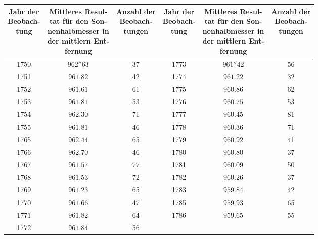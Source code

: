 \begin{center}\small
\setlength{\tabcolsep}{3pt}
\begin{tabular}{c|c|c||c|c|c}
\shortstack{Jahr der\\Beobach-\\tung}&\shortstack{Mittleres Resul-\\tat für den Son-\\nenhalbmesser in\\der mittlern Ent-\\fernung}&\shortstack{Anzahl der\\Beobach-\\tungen}&\shortstack{Jahr der\\Beobach-\\tung}&\shortstack{Mittleres Resul-\\tat für den Son-\\nenhalbmesser in\\der mittlern Ent-\\fernung}&\shortstack{Anzahl der\\Beobach-\\tungen}\\ \hline
1750 & $962''63$ & 37 & 1773 & $961''42$ & 56 \\
1751 & $961.82$ & 42 & 1774 & $961.22$ & 32 \\
1752 & $961.61$ & 61 & 1775 & $960.86$ & 62 \\
1753 & $961.81$ & 53 & 1776 & $960.75$ & 53 \\
1754 & $962.30$ & 71 & 1777 & $960.45$ & 81 \\
1755 & $961.81$ & 46 & 1778 & $960.36$ & 71 \\
1765 & $962.44$ & 65 & 1779 & $960.92$ & 41 \\
1766 & $962.70$ & 46 & 1780 & $960.80$ & 37 \\
1767 & $961.57$ & 77 & 1781 & $960.09$ & 50 \\
1768 & $961.53$ & 72 & 1782 & $960.26$ & 37 \\
1769 & $961.23$ & 65 & 1783 & $959.84$ & 42 \\
1770 & $961.66$ & 47 & 1785 & $959.93$ & 65 \\
1771 & $961.82$ & 64 & 1786 & $959.65$ & 55 \\
1772 & $961.84$ & 56 & & & \\
\end{tabular}\end{center}

